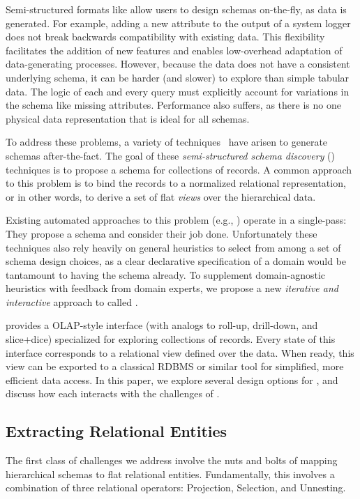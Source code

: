 
Semi-structured formats like \json allow users to design schemas on-the-fly, as data is generated.
For example, adding a new attribute to the output of a system logger does not break backwards compatibility with existing data.
This flexibility facilitates the addition of new features and enables low-overhead adaptation of data-generating processes.
However, because the data does not have a consistent underlying schema, it can be harder (and slower) to explore than simple tabular data.
The logic of each and every query must explicitly account for variations in the schema like missing attributes.  
Performance also suffers, as there is no one physical data representation that is ideal for all schemas.

To address these problems, a variety of techniques~\cite{DBLP:conf/cidr/LiuG15,DBLP:conf/edbt/BaaziziLCGS17,DBLP:conf/sigmod/DiScalaA16,DBLP:conf/vldb/GoldmanW97,spoth:2017:cidr:adaptive} have arisen to generate schemas after-the-fact.
The goal of these \emph{semi-structured schema discovery} (\sssd) techniques is to propose a schema for collections of \json records.
A common approach to this problem is to bind the \json records to a normalized relational representation, or in other words, to derive a set of flat \emph{views} over the hierarchical \json data.

Existing automated approaches to this problem (e.g., \cite{DBLP:conf/sigmod/DiScalaA16,DBLP:conf/vldb/GoldmanW97}) operate in a single-pass: They propose a schema and consider their job done.
Unfortunately these techniques also rely heavily on general heuristics to select from among a set of schema design choices, as a clear declarative specification of a domain would be tantamount to having the schema already.
To supplement domain-agnostic heuristics with feedback from domain experts, we propose a new \emph{iterative and interactive} approach to \sssd called \systemnametwo.

\systemnametwo provides a OLAP-style interface (with analogs to roll-up, drill-down, and slice+dice) specialized for exploring collections of \json records.  
Every state of this interface corresponds to a relational view defined over the \json data.
When ready, this view can be exported to a classical RDBMS or similar tool for simplified, more efficient data access.
In this paper, we explore several design options for \systemnametwo, and discuss how each interacts with the challenges of \sssd.

\subsection{Extracting Relational Entities}
The first class of challenges we address involve the nuts and bolts of mapping hierarchical \json schemas to flat relational entities.  
Fundamentally, this involves a combination of three relational operators: Projection, Selection, and Unnesting.  

